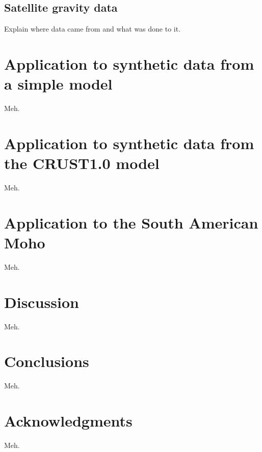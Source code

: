 \documentclass[extra,mreferee]{gji}
\begin{document}

\subsection{Satellite gravity data}


Explain where data came from and what was done to  it.


\section{Application to synthetic data from a simple model}


Meh.


\section{Application to synthetic data from the CRUST1.0 model}

Meh.


\section{Application to the South American Moho}


Meh.

\section{Discussion}

Meh.

\section{Conclusions}

Meh.

\section{Acknowledgments}

Meh.



\end{document}
